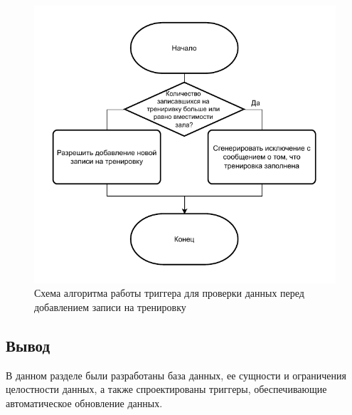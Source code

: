 \begin{figure}[ht!]
	\includegraphics[scale=0.75]{./diag/trg-ins-attendance.pdf}
	\caption{Схема алгоритма работы триггера для проверки данных перед добавлением записи на тренировку}
	\label{fig:tg-att-capacity}
\end{figure}

\subsection*{Вывод}

В данном разделе были разработаны база данных, ее сущности и ограничения целостности данных, а также спроектированы триггеры, обеспечивающие автоматическое обновление данных.


